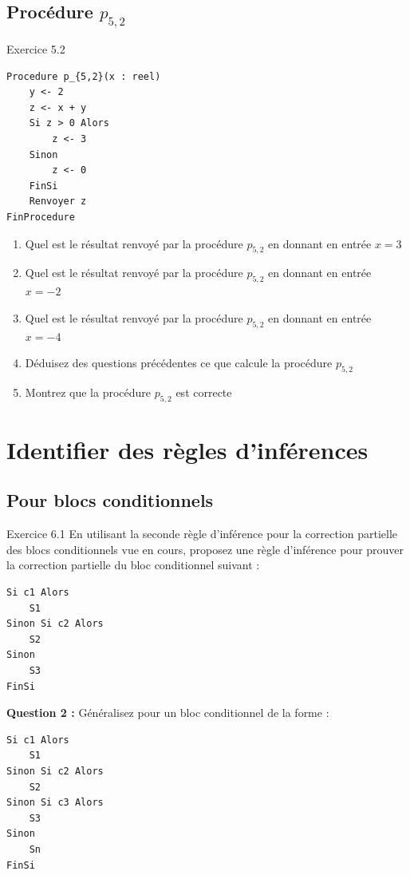 \documentclass[a4paper,11pt]{article}
\begin{document}
\subsection{Procédure $p_{5,2}$}

\begin{exercisebox}{Exercice 5.2}
\begin{lstlisting}
Procedure p_{5,2}(x : reel)
    y <- 2
    z <- x + y
    Si z > 0 Alors
        z <- 3
    Sinon
        z <- 0
    FinSi
    Renvoyer z
FinProcedure
\end{lstlisting}

\begin{enumerate}
    \item Quel est le résultat renvoyé par la procédure $p_{5,2}$ en donnant en entrée $x = 3$
    \item Quel est le résultat renvoyé par la procédure $p_{5,2}$ en donnant en entrée $x = -2$
    \item Quel est le résultat renvoyé par la procédure $p_{5,2}$ en donnant en entrée $x = -4$
    \item Déduisez des questions précédentes ce que calcule la procédure $p_{5,2}$
    \item Montrez que la procédure $p_{5,2}$ est correcte
\end{enumerate}
\end{exercisebox}

\section{Identifier des règles d'inférences}

\subsection{Pour blocs conditionnels}

\begin{exercisebox}{Exercice 6.1}
En utilisant la seconde règle d'inférence pour la correction partielle des blocs conditionnels vue en cours, proposez une règle d'inférence pour prouver la correction partielle du bloc conditionnel suivant :

\begin{lstlisting}
Si c1 Alors
    S1
Sinon Si c2 Alors
    S2
Sinon
    S3
FinSi
\end{lstlisting}

\textbf{Question 2 :} Généralisez pour un bloc conditionnel de la forme :

\begin{lstlisting}
Si c1 Alors
    S1
Sinon Si c2 Alors
    S2
Sinon Si c3 Alors
    S3
Sinon
    Sn
FinSi
\end{lstlisting}
\end{exercisebox}
\end{document}
